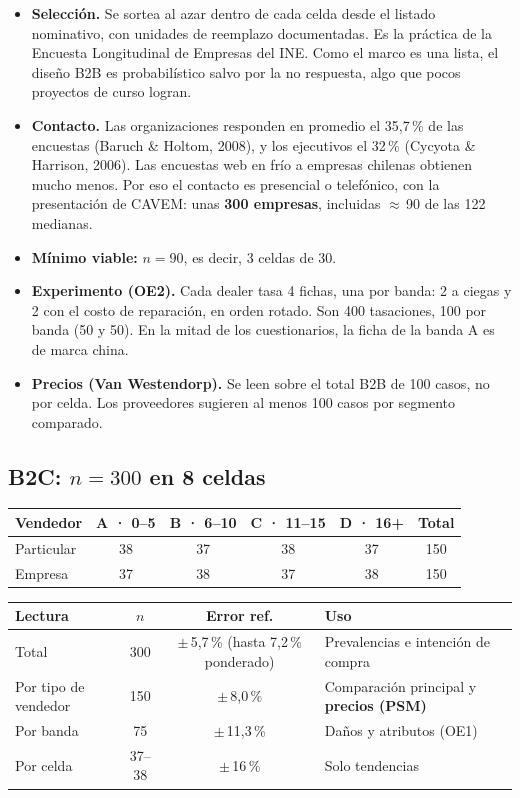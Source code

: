 \documentclass[11pt,a4paper]{article}
\begin{document}
\begin{itemize}
\item \textbf{Selección.} Se sortea al azar dentro de cada celda desde el listado nominativo, con unidades de reemplazo documentadas. Es la práctica de la Encuesta Longitudinal de Empresas del INE. Como el marco es una lista, el diseño B2B es probabilístico salvo por la no respuesta, algo que pocos proyectos de curso logran.
\item \textbf{Contacto.} Las organizaciones responden en promedio el 35,7\,\% de las encuestas (Baruch \& Holtom, 2008), y los ejecutivos el 32\,\% (Cycyota \& Harrison, 2006). Las encuestas web en frío a empresas chilenas obtienen mucho menos. Por eso el contacto es presencial o telefónico, con la presentación de CAVEM: unas \textbf{300 empresas}, incluidas $\approx$\,90 de las 122 medianas.
\item \textbf{Mínimo viable:} $n=90$, es decir, 3 celdas de 30.
\item \textbf{Experimento (OE2).} Cada dealer tasa 4 fichas, una por banda: 2 a ciegas y 2 con el costo de reparación, en orden rotado. Son 400 tasaciones, 100 por banda (50 y 50). En la mitad de los cuestionarios, la ficha de la banda A es de marca china.
\item \textbf{Precios (Van Westendorp).} Se leen sobre el total B2B de 100 casos, no por celda. Los proveedores sugieren al menos 100 casos por segmento comparado.
\end{itemize}

\subsection{B2C: $n=300$ en 8 celdas}
\begin{center}\small
\begin{tabularx}{\textwidth}{@{}lCCCCc@{}}
\toprule
\textbf{Vendedor} & \textbf{A · 0–5} & \textbf{B · 6–10} & \textbf{C · 11–15} & \textbf{D · 16+} & \textbf{Total}\\
\midrule
Particular & 38 & 37 & 38 & 37 & 150\\
Empresa & 37 & 38 & 37 & 38 & 150\\
\bottomrule
\end{tabularx}
\end{center}

\begin{center}\small
\begin{tabularx}{\textwidth}{@{}lccL@{}}
\toprule
\textbf{Lectura} & \textbf{$n$} & \textbf{Error ref.} & \textbf{Uso}\\
\midrule
Total & 300 & $\pm$\,5,7\,\% (hasta 7,2\,\% ponderado) & Prevalencias e intención de compra\\
Por tipo de vendedor & 150 & $\pm$\,8,0\,\% & Comparación principal y \textbf{precios (PSM)}\\
Por banda & 75 & $\pm$\,11,3\,\% & Daños y atributos (OE1)\\
Por celda & 37–38 & $\pm$\,16\,\% & Solo tendencias\\
\bottomrule
\end{tabularx}
\end{center}
\end{document}
